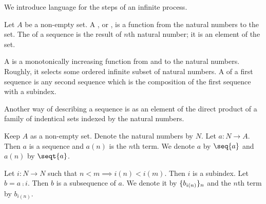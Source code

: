 
\sbasic








\sstart
{}


We introduce language
for the steps of an
infinite process.


Let $A$ be a non-empty
set.
A ,
  or ,
is a function
from the natural numbers to the
set.
The  of a sequence
is the result of $n$th natural
number; it is an element of
the set.

A  is a monotonically
increasing function from and to the
natural numbers.
Roughly,
it
selects some ordered infinite
subset of natural numbers.
A  of a first
sequence is any second sequence
which is the composition of the
first sequence with a subindex.


Another way of describing a sequence
is as an element of the direct product
of a family of indentical sets indexed
by the natural numbers.


Keep $A$ as a non-empty set.
Denote the natural numbers by $N$.
Let $a: N \to A$.
Then $a$ is a sequence and
$a(n)$ is the $n$th term.
We denote $a$ by
$\seq{a}$ and $a(n)$ by $\seqt{a}$.

Let $i: N \to N$ such that
$n < m \implies i(n) < i(m)$.
Then $i$ is a subindex.
Let $b = a \comp i$.
Then $b$ is a subsequence of $a$.
We denote it by
$\{b_{i(n)}\}_n$ and the $n$th
term by $b_{i(n)}$.
\strats
